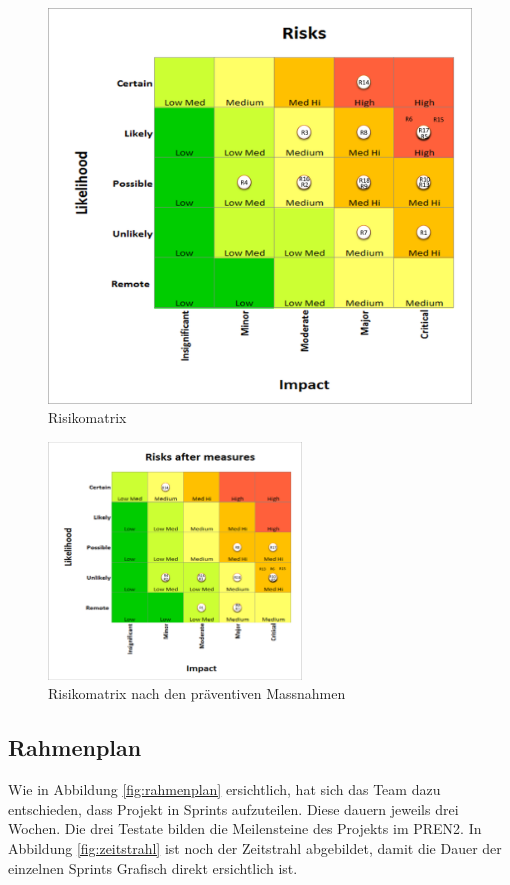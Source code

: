 \newpage

\begin{figure}[H]
  \centering
  \includegraphics[width=0.6 \textwidth]{img/risikomanagement/Risks.png}
  \caption{Risikomatrix}
  \label{fig:risk-matrix}
\end{figure}

\begin{figure}[H]
  \centering
  \includegraphics[width=0.60\textwidth]{img/risikomanagement/RisksAfterMeasures.png}
  \caption{Risikomatrix nach den präventiven Massnahmen}
  \label{fig:risk-matrix-after-measures}
\end{figure}

\newpage
  
\subsection{Rahmenplan}
Wie in Abbildung \ref{fig:rahmenplan} ersichtlich, hat sich das Team dazu entschieden, dass Projekt in Sprints aufzuteilen. Diese dauern jeweils drei Wochen. Die drei Testate bilden die Meilensteine des Projekts im PREN2. In Abbildung \ref{fig:zeitstrahl} ist noch der Zeitstrahl abgebildet, damit die Dauer der einzelnen Sprints Grafisch direkt ersichtlich ist.

